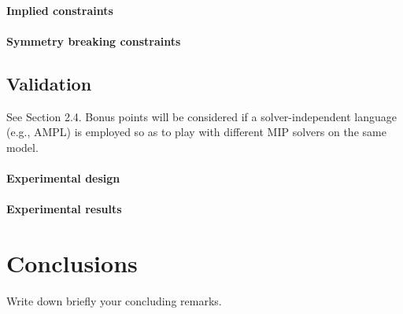 \documentclass{article}
\begin{document}
\paragraph{Implied constraints}

\paragraph{Symmetry breaking constraints}

\subsection{Validation}
See Section 2.4. Bonus points will be considered if a solver-independent language (e.g., AMPL) is employed so as to play with different MIP solvers on the same model.

\paragraph{Experimental design}

\paragraph{Experimental results}


\section{Conclusions}
Write down briefly your concluding remarks.
\end{document}
